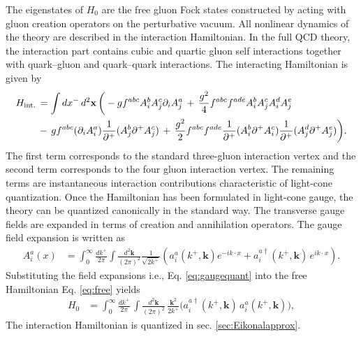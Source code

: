 \documentclass[a4paper,11pt]{article}
\def\v#1{\mathbf{#1}}
\begin{document}
The eigenstates of $H_{0}$ are the free gluon Fock states constructed by acting with gluon creation operators on the perturbative vacuum. All nonlinear dynamics of the theory are described in the interaction Hamiltonian. In the full QCD theory, the interaction part contains cubic and quartic gluon self interactions together with quark–gluon and quark–quark interactions. The interacting Hamiltonian is given by
\begin{align} \label{eq:Hint}
    H_{\text{int.}}\, & = \int dx^{-}\, d^{2}\v{x}\,\bigg(-gf^{abc}A_{i}^{b}A_{j}^{c}\partial_{i}A_{j}^{a}\,+\,\frac{g^{2}}{4}f^{abc}f^{ade}A_{i}^{b}A_{j}^{c}A_{i}^{d}A_{j}^{e}\,\notag \\
&-\, gf^{abc}(\partial_{i}A_{i}^{a})\frac{1}{\partial^{+}}(A_{j}^{b}\partial^{+}A_{j}^{c})\,+\,\frac{g^{2}}{2}f^{abc}f^{ade}\frac{1}{\partial^{+}}(A_{i}^{b}\partial^{+}A_{i}^{c})\frac{1}{\partial^{+}}(A_{j}^{d}\partial^{+}A_{j}^{e})\bigg).
\end{align}
The first term corresponds to the standard three-gluon interaction vertex and the second term corresponds to the four gluon interaction vertex. The remaining terms are instantaneous interaction contributions characteristic of light-cone quantization. Once the Hamiltonian has been formulated in light-cone gauge, the theory can be quantized canonically in the standard way. The transverse gauge fields are expanded in terms of creation and annihilation operators. The gauge field expansion is written as
\begin{align} \label{eq:gaugequant}
    A_{i}^{a}(x) & =\int_{0}^{\infty}\frac{dk^{+}}{2\pi}\int\frac{d^{2}\mathbf{k}}{(2\pi)^{2}}\frac{1}{\sqrt{2k^{+}}}\left(a_{i}^{a}(k^{+},\mathbf{k})e^{-ik\cdot x}+a_{i}^{a\dagger}(k^{+},\mathbf{k})\,e^{ik\cdot x}\right).
\end{align}
Substituting the field expansions i.e., Eq. \eqref{eq:gaugequant} into the free Hamiltonian Eq. \eqref{eq:free} yields
\begin{align} \label{eq:freecan}
    H_{0} & =\int_{0}^{\infty}\frac{dk^{+}}{2\pi}\, \int\frac{d^{2}\mathbf{k}}{(2\pi)^{2}}\, \frac{\mathbf{k}^{2}}{2k^{+}}\bigg(a_{i}^{a\dagger}(k^{+},\mathbf{k})\, a_{i}^{a}(k^{+},\mathbf{k}) \bigg),
\end{align} 
The interaction Hamiltonian is quantized in sec. \ref{sec:Eikonalapprox}.
\end{document}
